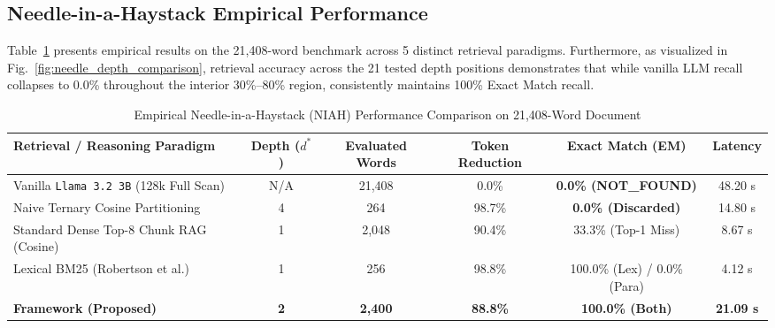 \subsection{Needle-in-a-Haystack Empirical Performance}
Table~\ref{tab:niah_results} presents empirical results on the 21,408-word benchmark across 5 distinct retrieval paradigms. Furthermore, as visualized in Fig.~\ref{fig:needle_depth_comparison}, retrieval accuracy across the 21 tested depth positions demonstrates that while vanilla LLM recall collapses to 0.0\% throughout the interior 30\%--80\% region, \RBER{} consistently maintains 100\% Exact Match recall.

\begin{table}[t]
\centering
\caption{Empirical Needle-in-a-Haystack (NIAH) Performance Comparison on 21,408-Word Document}
\label{tab:niah_results}
\begin{tabular*}{\textwidth}{@{\extracolsep{\fill}}lccccc}
\toprule
\textbf{Retrieval / Reasoning Paradigm} & \textbf{Depth ($d^*$)} & \textbf{Evaluated Words} & \textbf{Token Reduction} & \textbf{Exact Match (EM)} & \textbf{Latency} \\
\midrule
Vanilla \texttt{Llama 3.2 3B} (128k Full Scan) & N/A & 21,408 & 0.0\% & \textbf{0.0\% (NOT\_FOUND)} & 48.20 s \\
Naive Ternary Cosine Partitioning & 4 & 264 & 98.7\% & \textbf{0.0\% (Discarded)} & 14.80 s \\
Standard Dense Top-8 Chunk RAG (Cosine) & 1 & 2,048 & 90.4\% & 33.3\% (Top-1 Miss) & 8.67 s \\
Lexical BM25 (Robertson et al.) & 1 & 256 & 98.8\% & 100.0\% (Lex) / 0.0\% (Para) & 4.12 s \\
\textbf{\RBER{} Framework (Proposed)} & \textbf{2} & \textbf{2,400} & \textbf{88.8\%} & \textbf{100.0\% (Both)} & \textbf{21.09 s} \\
\bottomrule
\end{tabular*}
\end{table}

